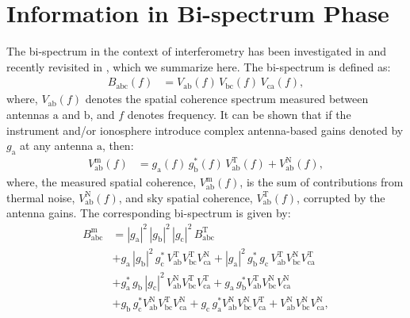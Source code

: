 \documentclass[
reprint,
superscriptaddress,
amsmath,
amssymb,
aps,
]{revtex4-1}
\begin{document}
\section{Information in Bi-spectrum Phase}\label{sec:CPinfo}

The bi-spectrum in the context of interferometry has been investigated in \cite{jen58,kul89,tay99,tho01} and recently revisited in \cite{car18}, which we summarize here. The bi-spectrum is defined as:
\begin{align}
  B_\textrm{abc}(f) &= V_\textrm{ab}(f)\,V_\textrm{bc}(f)\,V_\textrm{ca}(f),
\end{align}
where, $V_\textrm{ab}(f)$ denotes the spatial coherence spectrum measured between antennas $\textrm{a}$ and $\textrm{b}$, and $f$ denotes frequency. It can be shown that if the instrument and/or ionosphere introduce complex antenna-based gains denoted by $g_\textrm{a}$ at any antenna $\textrm{a}$, then: 
\begin{align}
  V_\textrm{ab}^\textrm{m}(f) &= g_\textrm{a}(f)\, g_\textrm{b}^*(f)\, V_\textrm{ab}^\textrm{T}(f) + V_\textrm{ab}^\textrm{N}(f),
\end{align}
where, the measured spatial coherence, $V_\textrm{ab}^\textrm{m}(f)$, is the sum of contributions from thermal noise, $V_\textrm{ab}^\textrm{N}(f)$, and sky spatial coherence, $V_\textrm{ab}^\textrm{T}(f)$, corrupted by the antenna gains. The corresponding bi-spectrum is given by:
\begin{align}
  B_\textrm{abc}^\textrm{m} &= |g_\textrm{a}|^2\, |g_\textrm{b}|^2\, |g_\textrm{c}|^2\, B_\textrm{abc}^\textrm{T} \\
  &+ g_\textrm{a}\,|g_\textrm{b}|^2\,g_\textrm{c}^*\,V_\textrm{ab}^\textrm{T}V_\textrm{bc}^\textrm{T}V_\textrm{ca}^\textrm{N} + |g_\textrm{a}|^2\,g_\textrm{b}^*\,g_\textrm{c}\,V_\textrm{ab}^\textrm{T}V_\textrm{bc}^\textrm{N}V_\textrm{ca}^\textrm{T} \nonumber \\
  &+ g_\textrm{a}^*\,g_\textrm{b}\,|g_\textrm{c}|^2\,V_\textrm{ab}^\textrm{N}V_\textrm{bc}^\textrm{T}V_\textrm{ca}^\textrm{T} + g_\textrm{a}\,g_\textrm{b}^*V_\textrm{ab}^\textrm{T}V_\textrm{bc}^\textrm{N}V_\textrm{ca}^\textrm{N} \nonumber \\
  &+ g_\textrm{b}\,g_\textrm{c}^*V_\textrm{ab}^\textrm{N}V_\textrm{bc}^\textrm{T}V_\textrm{ca}^\textrm{N} + g_\textrm{c}\,g_\textrm{a}^*V_\textrm{ab}^\textrm{N}V_\textrm{bc}^\textrm{N}V_\textrm{ca}^\textrm{T} + V_\textrm{ab}^\textrm{N}V_\textrm{bc}^\textrm{N}V_\textrm{ca}^\textrm{N}, \nonumber 
\end{align}
\end{document}

